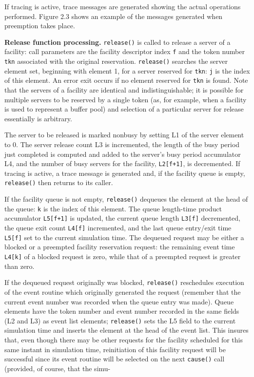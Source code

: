If tracing is active, trace messages are generated showing the actual
operations performed. Figure 2.3 shows an example of the messages
generated when preemption takes place.

\textbf{Release function processing.} \texttt{release()} is called to release a server of a
facility: call parameters are the facility descriptor index \texttt{f} and the token
number \texttt{tkn} associated with the original reservation. \texttt{release()} searches
the server element set, beginning with element 1, for a server reserved for
\texttt{tkn}: \texttt{j} is the index of this element. An error exit occurs if no element
reserved for \texttt{tkn} is found. Note that the servers of a facility are identical
and indistinguishable; it is possible for multiple servers to be reserved by a
single token (as, for example, when a facility is used to represent a buffer
pool) and selection of a particular server for release essentially is arbitrary.

The server to be released is marked nonbusy by setting L1 of the server
element to 0. The server release count L3 is incremented, the length of the
busy period just completed is computed and added to the server's busy period
accumulator L4, and the number of busy servers for the facility, \texttt{L2[f+1]}, is
decremented. If tracing is active, a trace message is generated and, if the
facility queue is empty, \texttt{release()} then returns to its caller.

If the facility queue is not empty, \texttt{release()} dequeues the element at
the head of the queue: \texttt{k} is the index of this element. The queue length-time
product accumulator \texttt{L5[f+1]} is updated, the current queue length \texttt{L3[f]}
decremented, the queue exit count \texttt{L4[f]} incremented, and the last queue
entry/exit time \texttt{L5[f]} set to the current simulation time. The dequeued
request may be either a blocked or a preempted facility reservation request:
the remaining event time \texttt{L4[k]} of a blocked request is zero, while that of a
preempted request is greater than zero.

If the dequeued request originally was blocked, \texttt{release()} reschedules
execution of the event routine which originally generated the request
(remember that the current event number was recorded when the queue entry
was made). Queue elements have the token number and event number
recorded in the same fields (L2 and L3) as event list elements; \texttt{release()}
sets the L5 field to the current simulation time and inserts the element at the
head of the event list. This insures that, even though there may be other
requests for the facility scheduled for this same instant in simulation time,
reinitiation of this facility request will be successful since its event routine
will be selected on the next \texttt{cause()} call (provided, of course, that the \mbox{simu-}

